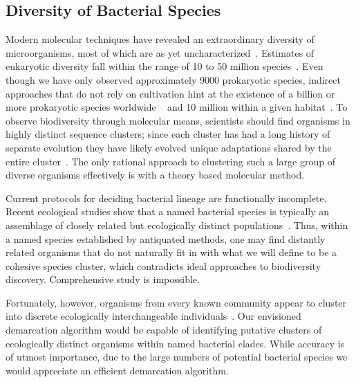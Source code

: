 \subsection{Diversity of Bacterial Species}
Modern molecular techniques have revealed an extraordinary diversity of microorganisms, most of which are as yet uncharacterized~\cite{bohannan2003new}.
Estimates of eukaryotic diversity fall within the range of 10 to 50 million species~\cite{may1988many}. Even though we have only observed approximately 9000 prokaryotic species, indirect approaches that do not rely on cultivation hint at the existence of a billion or more prokaryotic species worldwide ~\cite{dykhuizen1998santa} and 10 million within a given habitat~\cite{gans2005computational}.
To observe biodiversity through molecular means, scientists should find organisms in highly distinct sequence clusters; since each cluster has had a long history of separate evolution they have likely evolved unique adaptations shared by the entire cluster~\cite{cohan2007systematics}.
The only rational approach to clustering such a large group of diverse organisms effectively is with a theory based molecular method.

Current protocols for deciding bacterial lineage are functionally incomplete. Recent ecological studies show that a named bacterial species is typically an assemblage of closely related but ecologically distinct populations~\cite{cohan2007systematics}.
Thus, within a named species established by antiquated methods, one may find distantly related organisms that do not naturally fit in with what we will define to be a cohesive species cluster, which contradicts ideal approaches to biodiversity discovery.
Comprehensive study is impossible.

Fortunately, however, organisms from every known community appear to cluster into discrete ecologically interchangeable individuals~\cite{cohan2007systematics}.
Our envisioned demarcation algorithm would be capable of identifying putative clusters of ecologically distinct organisms within named bacterial clades.
While accuracy is of utmost importance, due to the large numbers of potential bacterial species we would appreciate an efficient demarcation algorithm.

